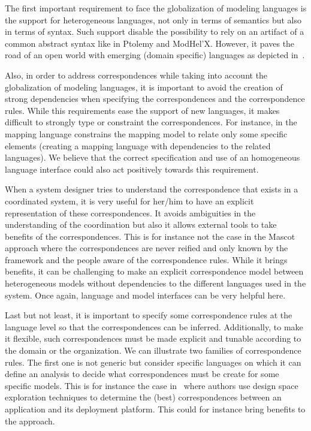 The first important requirement to face the globalization of modeling languages is the support for heterogeneous languages, not only in terms of semantics but also in terms of syntax. Such support disable the possibility to rely on an artifact of a common abstract syntax like in Ptolemy and ModHel'X. However, it paves the road of an open world with emerging (domain specific) languages as depicted in~\cite{globalization_ieee}.

Also, in order to address correspondences while taking into account the globalization of modeling languages, it is important to avoid the creation of strong dependencies when specifying the correspondences and the correspondence rules. While this requirements ease the support of new languages, it makes difficult to strongly type or constraint the correspondences. For instance, in \cite{dinatale} the mapping language constrains the mapping model to relate only some specific elements (creating a mapping language with dependencies to the related languages). We believe that the correct specification and use of an homogeneous language interface could also act positively towards this requirement. 

When a system designer tries to understand the correspondence that exists in a coordinated system, it is very useful for her/him to have an explicit representation of these correspondences. It avoids ambiguities in the understanding of the coordination but also it allows external tools to take benefits of the correspondences. This is for instance not the case in the Mascot approach where the correspondences are never reified and only known by the framework and the people aware of the correspondence rules. While it brings benefits, it can be challenging to make an explicit correspondence model between heterogeneous models without dependencies to the different languages used in the system. Once again, language and model interfaces can be very helpful here. 

Last but not least, it is important to specify some correspondence rules at the language level so that the correspondences can be inferred. Additionally, to make it flexible, such correspondences must be made explicit and tunable according to the domain or the organization. 
We can illustrate two families of correspondence rules.
The first one is not generic but consider specific languages on which it can define an analysis to decide what correspondences must be create for some specific models. This is for instance the case in~\cite{kofmanbib} where authors use design space exploration techniques to determine the (best) correspondences between an application and its deployment platform. This could for instance bring benefits to the \cite{dinatale} approach.

